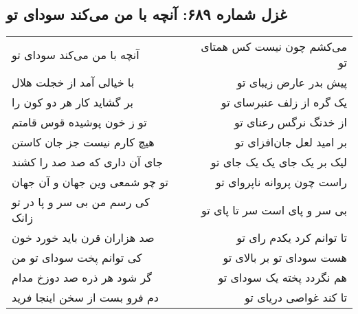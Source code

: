 \begin{center}
\section*{غزل شماره ۶۸۹: آنچه با من می‌کند سودای تو}
\label{sec:689}
\begin{longtable}{l p{0.5cm} r}
آنچه با من می‌کند سودای تو
&&
می‌کشم چون نیست کس همتای تو
\\
با خیالی آمد از خجلت هلال
&&
پیش بدر عارض زیبای تو
\\
بر گشاید کار هر دو کون را
&&
یک گره از زلف عنبرسای تو
\\
تو ز خون پوشیده قوس قامتم
&&
از خدنگ نرگس رعنای تو
\\
هیچ کارم نیست جز جان کاستن
&&
بر امید لعل جان‌افزای تو
\\
جای آن داری که صد صد را کشند
&&
لیک بر یک جای یک یک جای تو
\\
تو چو شمعی وین جهان و آن جهان
&&
راست چون پروانه ناپروای تو
\\
کی رسم من بی سر و پا در تو زانک
&&
بی سر و پای است سر تا پای تو
\\
صد هزاران قرن باید خورد خون
&&
تا توانم کرد یکدم رای تو
\\
کی توانم پخت سودای تو من
&&
هست سودای تو بر بالای تو
\\
گر شود هر ذره صد دوزخ مدام
&&
هم نگردد پخته یک سودای تو
\\
دم فرو بست از سخن اینجا فرید
&&
تا کند غواصی دریای تو
\\
\end{longtable}
\end{center}

